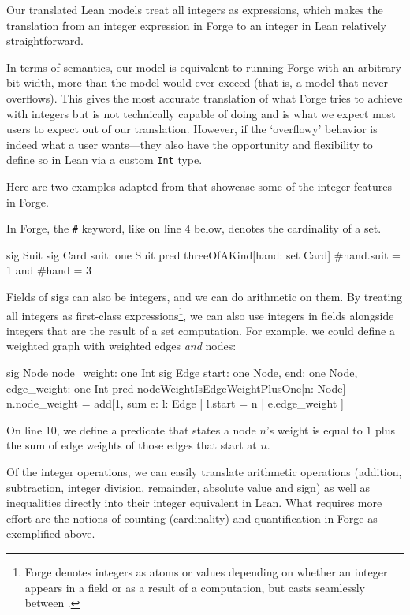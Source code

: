 Our translated Lean models treat all integers as expressions, which makes the translation from an integer expression in Forge to an integer in Lean relatively straightforward. 

In terms of semantics, our model is equivalent to running Forge with an arbitrary bit width, more than the model would ever exceed (that is, a model that never overflows). This gives the most accurate translation of what Forge tries to achieve with integers but is not technically capable of doing and is what we expect most users to expect out of our translation. However, if the `overflowy' behavior is indeed what a user wants---they also have the opportunity and flexibility to define so in Lean via a custom \texttt{Int} type. 

Here are two examples adapted from \cite{jackson2012software} that showcase some of the integer features in Forge. 

In Forge, the \texttt{\#} keyword, like on line 4 below, denotes the cardinality of a set. 

\begin{forge}
sig Suit {}
sig Card { suit: one Suit }
pred threeOfAKind[hand: set Card] {
  #hand.suit = 1 and #hand = 3
}
\end{forge}

Fields of sigs can also be integers, and we can do arithmetic on them. By treating all integers as first-class expressions\footnote{Forge denotes integers as atoms or values depending on whether an integer appears in a field or as a result of a computation, but casts seamlessly between \cite{forge-docs,nelson2024artifact}.}, we can also use integers in fields alongside integers that are the result of a set computation. For example, we could define a weighted graph with weighted edges \emph{and} nodes:

\begin{forge}
sig Node {
  node_weight: one Int
}
sig Edge {
  start: one Node,
  end: one Node,
  edge_weight: one Int
}
pred nodeWeightIsEdgeWeightPlusOne[n: Node] {
  n.node_weight = add[1, sum e: { l: Edge | l.start = n } | { e.edge_weight }]
}
\end{forge}

On line 10, we define a predicate that states a node $n$'s weight is equal to $1$ plus the sum of edge weights of those edges that start at $n$. 

Of the integer operations, we can easily translate arithmetic operations (addition, subtraction, integer division, remainder, absolute value and sign) as well as inequalities directly into their integer equivalent in Lean. What requires more effort are the notions of counting (cardinality) and quantification in Forge as exemplified above. 

